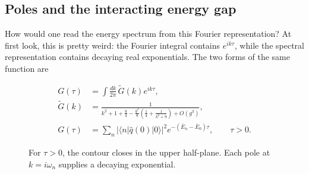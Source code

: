 \subsection{Poles and the interacting energy gap}
\label{sec:253a-dressed-poles}

How would one read the energy spectrum from this Fourier representation? At
first look, this is pretty weird: the Fourier integral contains $e^{ik\tau}$,
while the spectral representation contains decaying real exponentials. The two
forms of the same function are

\begin{equation}
 \begin{aligned}
 G(\tau)&=\int\frac{dk}{2\pi}\,\widetilde G(k)e^{ik\tau},\\
 \widetilde G(k)&=
 \frac{1}{k^2+1+\frac{g}{4}
 -\frac{g^2}{8}\left(\frac{1}{4}+\frac{1}{k^2+9}\right)+O(g^3)},\\
 G(\tau)&=\sum_n
 \left|\langle n|\widehat q(0)|0\rangle\right|^2
 e^{-(\bar E_n-\bar E_0)\tau},
 \qquad \tau>0.
 \end{aligned}
 \label{eq:253a-dressed-and-spectral}
\end{equation}

\begin{figure}[H]
 \centering
 \caption{For $\tau>0$, the contour closes in the upper half-plane. Each pole
 at $k=i\omega_n$ supplies a decaying exponential.}
 \label{fig:253a-dressed-poles}
\end{figure}

